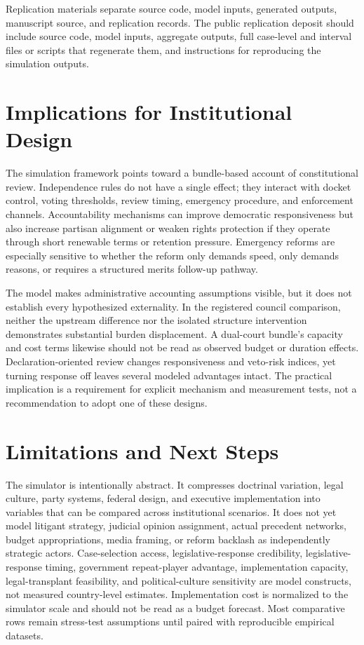 \documentclass[
  journal=small,
  manuscript=research-article,
  year=2026
]{cup-journal}
\begin{document}
Replication materials separate source code, model inputs, generated outputs, manuscript source, and replication records. The public replication deposit should include source code, model inputs, aggregate outputs, full case-level and interval files or scripts that regenerate them, and instructions for reproducing the simulation outputs.

\section{Implications for Institutional Design}
\label{sec:implications}

The simulation framework points toward a bundle-based account of constitutional review. Independence rules do not have a single effect; they interact with docket control, voting thresholds, review timing, emergency procedure, and enforcement channels. Accountability mechanisms can improve democratic responsiveness but also increase partisan alignment or weaken rights protection if they operate through short renewable terms or retention pressure. Emergency reforms are especially sensitive to whether the reform only demands speed, only demands reasons, or requires a structured merits follow-up pathway.

The model makes administrative accounting assumptions visible, but it does not establish every hypothesized externality. In the registered council comparison, neither the upstream difference nor the isolated structure intervention demonstrates substantial burden displacement. A dual-court bundle's capacity and cost terms likewise should not be read as observed budget or duration effects. Declaration-oriented review changes responsiveness and veto-risk indices, yet turning response off leaves several modeled advantages intact. The practical implication is a requirement for explicit mechanism and measurement tests, not a recommendation to adopt one of these designs.

\section{Limitations and Next Steps}
\label{sec:limits}

The simulator is intentionally abstract. It compresses doctrinal variation, legal culture, party systems, federal design, and executive implementation into variables that can be compared across institutional scenarios. It does not yet model litigant strategy, judicial opinion assignment, actual precedent networks, budget appropriations, media framing, or reform backlash as independently strategic actors. Case-selection access, legislative-response credibility, legislative-response timing, government repeat-player advantage, implementation capacity, legal-transplant feasibility, and political-culture sensitivity are model constructs, not measured country-level estimates. Implementation cost is normalized to the simulator scale and should not be read as a budget forecast. Most comparative rows remain stress-test assumptions until paired with reproducible empirical datasets.
\end{document}
